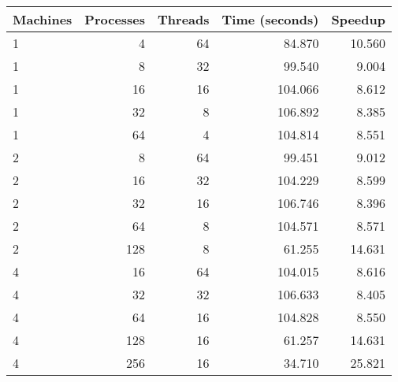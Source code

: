 \begin{tabular}{lrrrr}
\toprule
Machines & Processes & Threads & Time (seconds) & Speedup \\
\midrule
1 & 4 & 64 & 84.870 & 10.560 \\
1 & 8 & 32 & 99.540 & 9.004 \\
1 & 16 & 16 & 104.066 & 8.612 \\
1 & 32 & 8 & 106.892 & 8.385 \\
1 & 64 & 4 & 104.814 & 8.551 \\
2 & 8 & 64 & 99.451 & 9.012 \\
2 & 16 & 32 & 104.229 & 8.599 \\
2 & 32 & 16 & 106.746 & 8.396 \\
2 & 64 & 8 & 104.571 & 8.571 \\
2 & 128 & 8 & 61.255 & 14.631 \\
4 & 16 & 64 & 104.015 & 8.616 \\
4 & 32 & 32 & 106.633 & 8.405 \\
4 & 64 & 16 & 104.828 & 8.550 \\
4 & 128 & 16 & 61.257 & 14.631 \\
4 & 256 & 16 & 34.710 & 25.821 \\
\bottomrule
\end{tabular}
